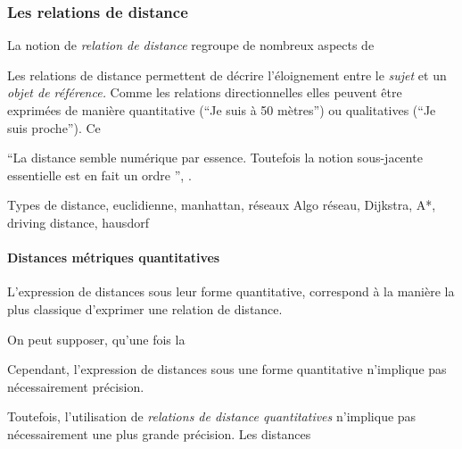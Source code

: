 \subsubsection{Les relations de distance}

La notion de \emph{relation de distance} regroupe de nombreux aspects
de  


Les relations de distance permettent de décrire l'éloignement entre le
\emph{sujet} et un \emph{objet de référence.} Comme les relations
directionnelles elles peuvent être exprimées de manière quantitative
(\eg \enquote{Je suis à 50 mètres}) ou qualitatives (\eg \enquote{Je
  suis proche}). Ce


\enquote{La distance \textelp{} semble \textelp{} numérique par
  essence. Toutefois \textelp{} la notion sous-jacente essentielle est
  en fait un ordre \textelp{}}, \textcite{Aurnague1997}.


Types de distance, euclidienne, manhattan, réseaux Algo réseau,
Dijkstra, A*, driving distance, hausdorf


\paragraph{Distances métriques quantitatives}

L'expression de distances sous leur forme quantitative, correspond à
la manière la plus classique d'exprimer une relation de distance.

On peut supposer, qu'une fois la

Cependant, l'expression de distances sous une forme quantitative
n'implique pas nécessairement précision. 

Toutefois, l'utilisation de \emph{relations de distance quantitatives}
n'implique pas nécessairement une plus grande précision. Les distances


